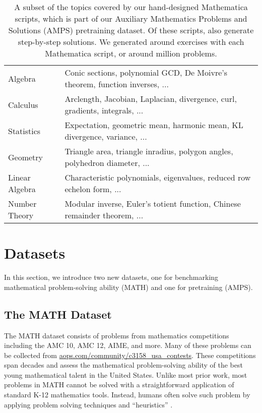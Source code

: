 \documentclass{article}
\begin{document}
 \begin{table*}[t]
	\centering
	\setlength\tabcolsep{10pt}
	\begin{tabular}{l|l}
        Algebra         & Conic sections, polynomial GCD, De Moivre's theorem, function inverses, ... \\ Calculus        & Arclength, Jacobian, Laplacian, divergence, curl, gradients, integrals, ... \\ Statistics      & Expectation, geometric mean, harmonic mean, KL divergence, variance, ... \\ Geometry        & Triangle area, triangle inradius, polygon angles, polyhedron diameter, ...\\ Linear Algebra      & Characteristic polynomials, eigenvalues, reduced row echelon form, ... \\ Number Theory       & Modular inverse, Euler's totient function, Chinese remainder theorem, ... \\ \end{tabular}
	\caption{A subset of the topics covered by our  hand-designed Mathematica scripts, which is part of our Auxiliary Mathematics Problems and Solutions (AMPS) pretraining dataset. Of these scripts,  also generate step-by-step solutions. We generated around  exercises with each Mathematica script, or around  million problems.}\label{fig:mesa}
	\vspace{-5pt}
\end{table*}

\section{Datasets}


In this section, we introduce two new datasets, one for benchmarking mathematical problem-solving ability (MATH) and one for pretraining (AMPS).


\subsection{The MATH Dataset}\label{subsec:math}
The MATH dataset consists of problems from mathematics competitions including the AMC 10, AMC 12, AIME, and more. Many of these problems can be collected from \href{https://artofproblemsolving.com/community/c3158_usa_contests}{aops.com/community/c3158\_usa\_contests}. These competitions span decades and assess the mathematical problem-solving ability of the best young mathematical talent in the United States.
Unlike most prior work, most problems in MATH cannot be solved with a straightforward application of standard K-12 mathematics tools.
Instead, humans often solve such problem by applying problem solving techniques and ``heuristics'' \citep{Polya1945HowTS}.
\end{document}
